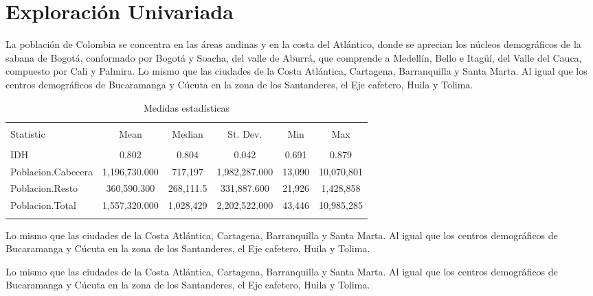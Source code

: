 \section{Exploración Univariada}\label{univariada}




La población de Colombia se concentra en las áreas andinas y en la costa del Atlántico, donde se aprecian los núcleos demográficos de la sabana de Bogotá, conformado por Bogotá y Soacha, del valle de Aburrá, que comprende a Medellín, Bello e Itagüí, del Valle del Cauca, compuesto por Cali y Palmira. Lo mismo que las ciudades de la Costa Atlántica, Cartagena, Barranquilla y Santa Marta. Al igual que los centros demográficos de Bucaramanga y Cúcuta en la zona de los Santanderes, el Eje cafetero, Huila y Tolima.

\begin{table}[!htbp] \centering 
  \caption{Medidas estadísticas} 
  \label{stats} 
\begin{tabular}{@{\extracolsep{5pt}}lccccc} 
\\[-1.8ex]\hline 
\hline \\[-1.8ex] 
Statistic & \multicolumn{1}{c}{Mean} & \multicolumn{1}{c}{Median} & \multicolumn{1}{c}{St. Dev.} & \multicolumn{1}{c}{Min} & \multicolumn{1}{c}{Max} \\ 
\hline \\[-1.8ex] 
IDH & 0.802 & 0.804 & 0.042 & 0.691 & 0.879 \\ 
Poblacion.Cabecera & 1,196,730.000 & 717,197 & 1,982,287.000 & 13,090 & 10,070,801 \\ 
Poblacion.Resto & 360,590.300 & 268,111.5 & 331,887.600 & 21,926 & 1,428,858 \\ 
Poblacion.Total & 1,557,320.000 & 1,028,429 & 2,202,522.000 & 43,446 & 10,985,285 \\ 
\hline \\[-1.8ex] 
\end{tabular} 
\end{table} 
Lo mismo que las ciudades de la Costa Atlántica, Cartagena, Barranquilla y Santa Marta. Al igual que los centros demográficos de Bucaramanga y Cúcuta en la zona de los Santanderes, el Eje cafetero, Huila y Tolima.

\clearpage

Lo mismo que las ciudades de la Costa Atlántica, Cartagena, Barranquilla y Santa Marta. Al igual que los centros demográficos de Bucaramanga y Cúcuta en la zona de los Santanderes, el Eje cafetero, Huila y Tolima.

